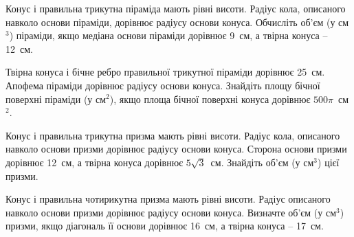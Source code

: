 \documentclass[12pt]{article}
\begin{document}
\begin{samepage}
\noindent\zadnum Конус і правильна трикутна піраміда мають рівні висоти. Радіус кола, описаного навколо основи піраміди, дорівнює радіусу основи конуса. Обчисліть об'єм (у см$^3$) піраміди, якщо медіана основи піраміди дорівнює 9~см, а твірна конуса – 12~см. 

\nmtnobreak
\nopagebreak\nbvspace{0.5cm}
\nmtAnswerBox
\par{}
\end{samepage}

\begin{samepage}
\noindent\zadnum Твірна конуса і бічне ребро правильної трикутної піраміди дорівнює 25~см. Апофема піраміди дорівнює радіусу основи конуса. Знайдіть площу бічної поверхні піраміди (у см$^2$), якщо площа бічної поверхні конуса дорівнює $500\pi$~см$^2$. 

\nmtnobreak
\nopagebreak\nbvspace{0.5cm}
\nmtAnswerBox
\par{}
\end{samepage}

\begin{samepage}
\noindent\zadnum Конус і правильна трикутна призма мають рівні висоти. Радіус кола, описаного навколо основи призми дорівнює радіусу основи конуса. Сторона основи призми дорівнює 12~см, а твірна конуса дорівнює $5\sqrt{3}$~см. Знайдіть об'єм (у см$^3$) цієї призми. 

\nmtnobreak
\nopagebreak\nbvspace{0.5cm}
\nmtAnswerBox
\par{}
\end{samepage}

\begin{samepage}
\noindent\zadnum Конус і правильна чотирикутна призма мають рівні висоти. Радіус описаного навколо основи призми дорівнює радіусу основи конуса. Визначте об'єм (у см$^3$) призми, якщо діагональ її основи дорівнює 16~см, а твірна конуса – 17~см. 

\nmtnobreak
\nopagebreak\nbvspace{0.5cm}
\nmtAnswerBox
\par{}
\end{samepage}
\end{document}
